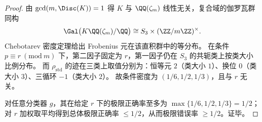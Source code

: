 \begin{proof}
由 \(\gcd(m,\Disc(K))=1\) 得 \(K\) 与 \(\QQ(\zeta_m)\) 线性无关，复合域的伽罗瓦群同构
\[
\Gal\bigl(K\QQ(\zeta_m)/\QQ\bigr)\cong S_3\times(\ZZ/m\ZZ)^\times.
\]
Chebotarev 密度定理给出 Frobenius 元在该直积群中的等分布。
在条件 \(p\equiv r\ (\mathrm{mod}\ m)\) 下，第二因子固定为 \(r\)，第一因子仍在 \(S_3\) 的共轭类上按类大小比例分布。
而 \(\rho_{\mathrm{std}}\) 的迹在三类上取值分别为：恒等元 \(2\)（类大小 \(1\)）、换位 \(0\)（类大小 \(3\)）、三循环 \(-1\)（类大小 \(2\)）。
故条件密度为 \((1/6,1/2,1/3)\)，且与 \(r\) 无关。

对任意分类器 \(g\)，其在给定 \(r\) 下的极限正确率至多为 \(\max\{1/6,1/2,1/3\}=1/2\)；
对 \(r\) 加权取平均得到总体极限正确率 \(\le 1/2\)，从而极限错误率 \(\ge 1/2\)。证毕。
\end{proof}
